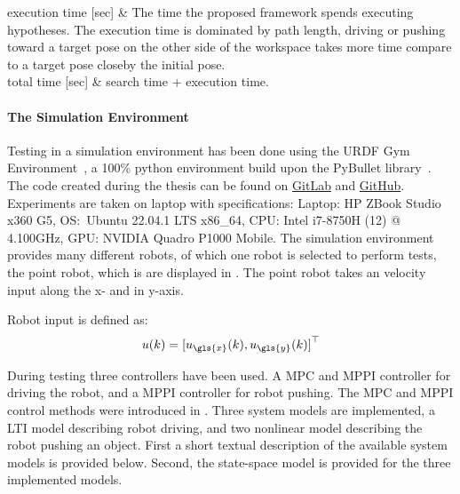 \begin{table}[H]
\begin{tabular}
execution time [sec] & The time the proposed framework spends executing hypotheses. The execution time is dominated by path length, driving or pushing toward a target pose on the other side of the workspace takes more time compare to a target pose closeby the initial pose.\\ 
total time [sec] & search time + execution time.\\
\end{tabular}
\end{table}

\paragraph{The Simulation Environment}
Testing in a simulation environment has been done using the URDF Gym Environment~\cite{spahn_urdfenvironment_2022}, a 100\% python environment build upon the PyBullet library~\cite{coumans_pybullet_2016}. The code created during the thesis can be found on \href{https://gitlab.tudelft.nl/airlab-delft/msc_projects/msc_gijs_groote}{GitLab} and \href{https://github.com/GijsGroote/semantic-thinking-robot}{GitHub}. Experiments are taken on laptop with specifications: Laptop: HP ZBook Studio x360 G5, OS:~Ubuntu 22.04.1 LTS x86\_64, CPU: Intel i7-8750H (12) @ 4.100GHz, GPU: NVIDIA Quadro P1000 Mobile. The simulation environment provides many different robots, of which one robot is selected to perform tests, the point robot, which is are displayed in . The point robot takes an velocity input along the \gls{x}- and in \gls{y}-axis.\bs

Robot input is defined as:\\
\[ u(k) = {[ u_{\gls{x}}(k), u_{\gls{y}}(k) ]}^\top \]

During testing three controllers have been used. A \ac{MPC} and \ac{MPPI} controller for driving the robot, and a \ac{MPPI} controller for robot pushing. The \ac{MPC} and \ac{MPPI} control methods were introduced in . Three system models are implemented, a \ac{LTI} model describing robot driving, and two nonlinear model describing the robot pushing an object. First a short textual description of the available system models is provided below. Second, the state-space model is provided for the three implemented models.\bs

